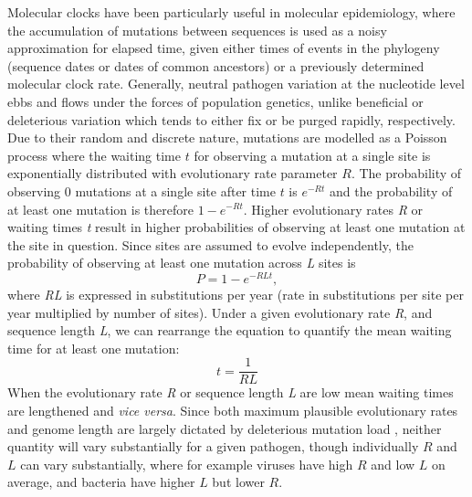 \documentclass[11pt,oneside,letterpaper]{article}
\begin{document}
Molecular clocks have been particularly useful in molecular epidemiology, where the accumulation of mutations between sequences is used as a noisy approximation for elapsed time, given either times of events in the phylogeny (sequence dates or dates of common ancestors) or a previously determined molecular clock rate.
Generally, neutral pathogen variation at the nucleotide level ebbs and flows under the forces of population genetics, unlike beneficial or deleterious variation which tends to either fix or be purged rapidly, respectively.
Due to their random and discrete nature, mutations are modelled as a Poisson process \citep{yang_computational_2006} where the waiting time $t$ for observing a mutation at a single site is exponentially distributed with evolutionary rate parameter $R$.
The probability of observing 0 mutations at a single site after time $t$ is $e^{-Rt}$ and the probability of at least one mutation is therefore $1-e^{-Rt}$.
Higher evolutionary rates \textit{R} or waiting times \textit{t} result in higher probabilities of observing at least one mutation at the site in question.
Since sites are assumed to evolve independently, the probability of observing at least one mutation across \textit{L} sites is
\begin{equation}
  P = 1-e^{-RLt},
\end{equation}
where \textit{RL} is expressed in substitutions per year (rate in substitutions per site per year multiplied by number of sites).
Under a given evolutionary rate \textit{R}, and sequence length \textit{L}, we can rearrange the equation to quantify the mean waiting time for at least one mutation:
\begin{equation}
  t = \frac{1}{RL}
  \label{horizon}
\end{equation}
When the evolutionary rate \textit{R} or sequence length \textit{L} are low mean waiting times are lengthened and \textit{vice versa}.
Since both maximum plausible evolutionary rates and genome length are largely dictated by deleterious mutation load \citep{gago_extremely_2009}, neither quantity will vary substantially for a given pathogen, though individually $R$ and $L$ can vary substantially, where for example viruses have high $R$ and low $L$ on average, and bacteria have higher $L$ but lower $R$.
\end{document}
